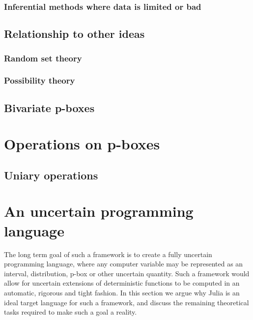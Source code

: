 \documentclass{juliacon}
\begin{document}
\subsubsection{Inferential methods where data is limited or bad} %


\subsection{Relationship to other ideas}

\subsubsection{Random set theory}

\subsubsection{Possibility theory}




\subsection{Bivariate p-boxes}


\section{Operations on p-boxes}

\subsection{Uniary operations}



\section{An uncertain programming language}
\label{sec:additional_faci}

The long term goal of such a framework is to create a fully uncertain programming language, where any computer variable may be represented as an interval, distribution, p-box or other uncertain quantity. Such a framework would allow for uncertain extensions of deterministic functions to be computed in an automatic, rigorous and tight fashion. In this section we argue why Julia is an ideal target language for such a framework, and discuss the remaining theoretical tasks required to make such a goal a reality. 


\end{document}
